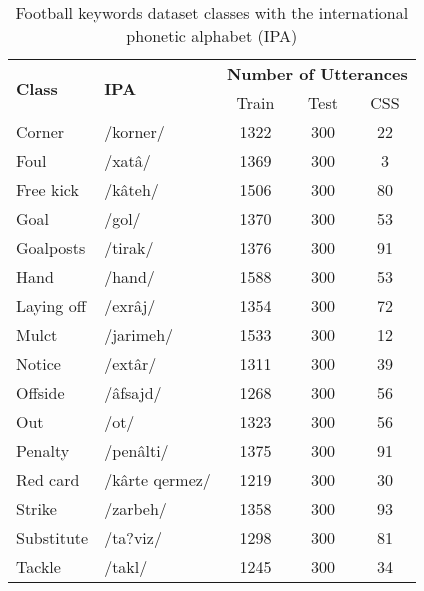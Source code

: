 \documentclass{article}
\let\ipa\textipa
\begin{document}
\begin{table}[h]\centering
\caption{Football keywords dataset classes with the international phonetic alphabet (IPA)}
\label{tbl:fkd_info}
\begin{tabular}{llccc}
\hline
\multirow{2}{*}{\textbf{Class}} & \multirow{2}{*}{\textbf{IPA}}  & \multicolumn{3}{c}{\textbf{Number of Utterances}}\\
  \cline{3-5}
                       &                       & Train         & Test        & CSS        \\
                       \hline
Corner                 & /korner/              & 1322          & 300         & 22         \\
Foul                   & /xatâ/                & 1369          & 300         & 3          \\
Free kick              & /kâ\ipa{S}teh/              & 1506          & 300         & 80         \\
Goal                   & /gol/                 & 1370          & 300         & 53         \\
Goalposts              & /tirak/               & 1376          & 300         & 91         \\
Hand                   & /hand/                & 1588          & 300         & 53         \\
Laying off             & /exrâj/               & 1354          & 300         & 72         \\
Mulct                  & /jarimeh/             & 1533          & 300         & 12         \\
Notice                 & /extâr/               & 1311          & 300         & 39         \\
Offside                & /âfsajd/              & 1268          & 300         & 56         \\
Out                    & /ot/                  & 1323          & 300         & 56         \\
Penalty                & /penâlti/             & 1375          & 300         & 91         \\
Red card               & /kârte qermez/        & 1219          & 300         & 30         \\
Strike                 & /zarbeh/              & 1358          & 300         & 93         \\
Substitute             & /ta?viz/              & 1298          & 300         & 81         \\
Tackle                 & /takl/                & 1245          & 300         & 34         \\

\end{tabular}
\end{table}
\end{document}
